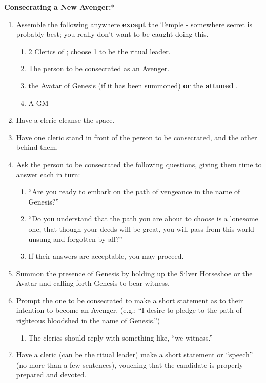\documentclass[green]{GL2020}
\begin{document}
\textbf{Consecrating a New Avenger:}$*$\\
\begin{enumerate}
  \item Assemble the following anywhere \textbf{except} the Temple - somewhere secret is probably best; you really don’t want to be caught doing this.
  \begin{enumerate}
    \item 2 Clerics of \cGenesis{}; choose 1 to be the ritual leader.
    \item The person to be consecrated as an Avenger.
    \item the Avatar of Genesis (if it has been summoned) \textbf{or} the \textbf{attuned} \iHorseshoe{}.
    \item A GM
  \end{enumerate}
  \item Have a cleric cleanse the space. 
  \item Have one cleric stand in front of the person to be consecrated, and the other behind them.
  \item Ask the person to be consecrated the following questions, giving them time to answer each in turn: 
  \begin{enumerate}
    \item ``Are you ready to embark on the path of vengeance in the name of Genesis?''
    \item ``Do you understand that the path you are about to choose is a lonesome one, that though your deeds will be great, you will pass from this world unsung and forgotten by all?''
    \item If their answers are acceptable, you may proceed.
  \end{enumerate}
  \item Summon the presence of Genesis by holding up the Silver Horseshoe or the Avatar and calling forth Genesis to bear witness.
  \item Prompt the one to be consecrated to make a short statement as to their intention to become an Avenger. (e.g.: ``I desire to pledge to the path of righteous bloodshed in the name of Genesis.'')
  \begin{enumerate}
    \item The clerics should reply with something like, ``we witness.''
  \end{enumerate}
  \item Have a cleric (can be the ritual leader) make a short statement or “speech” (no more than a few sentences), vouching that the candidate is properly prepared and devoted.

\end{enumerate}
\end{document}
